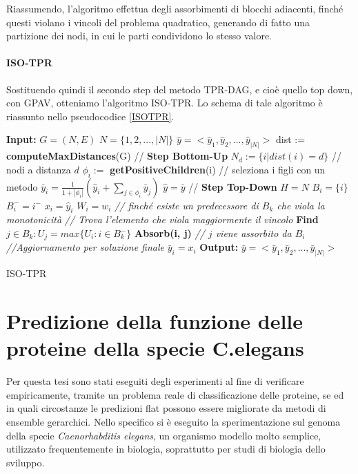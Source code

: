 \documentclass[12pt]{report}
\begin{document}
Riassumendo, l'algoritmo effettua degli assorbimenti di blocchi adiacenti, finché questi violano i vincoli del problema quadratico, generando di fatto una partizione dei nodi, in cui le parti condividono lo stesso valore.

\subsubsection{ISO-TPR}
Sostituendo quindi il secondo step del metodo TPR-DAG, e cioè quello top down, con GPAV, otteniamo l'algoritmo ISO-TPR. Lo schema di tale algoritmo è riassunto nello pseudocodice \ref{ISOTPR}.

\begin{algorithm}[!htp]

\begin{algorithmic}[1]
\State \textbf{Input: }
\State $G = (N, E)$
\State $N = \{1, 2, ..., |N|\} $ 
\State $\hat{y} = <\hat{y}_1, \hat{y}_2, ...,\hat{y}_{|N|}>$
\State dist := \textbf{computeMaxDistances}(G)
\State // \textbf{Step Bottom-Up}
\State $N_d := \{i|dist(i) = d\}$ // nodi a distanza $d$ 
\State $\phi_i :=$  \textbf{getPositiveChildren}(i) // seleziona i figli con un metodo
\State $\bar{y}_i = \frac{1}{1 + |\phi_i|} (\hat{y}_i + \sum_{j \in \phi_i} \bar{y}_j)$
\EndFor
\EndFor
\State $\hat{y} = \bar{y}$
\State // \textbf{Step Top-Down}
\State $ H = N $
\State $B_i = \{i\}$ 
\State $B_i^{-} = i^{-}$
\State $x_i = \hat{y}_i$
\State $W_i = w_i$
\EndFor
{}
\State \emph{// finché esiste un predecessore di $B_{k}$ che viola la monotonicità}
\State \emph{// Trova l'elemento che viola maggiormente il vincolo}
\State \textbf{Find} $j \in B_k: U_j = max\{U_i : i \in B_k^{-}\}$ 
\State \textbf{Absorb(i, j)} \emph{// $j$ viene assorbito da $B_i$}
\EndWhile
\EndFor
\State \emph{//Aggiornamento per soluzione finale }  
\State $\bar{y}_i = x_i$  
\EndFor
\EndFor
\EndProcedure
\State \textbf{Output: }
\State $\bar{y} = <\bar{y}_1, \bar{y}_2, ...,\bar{y}_{|N|}>$
\end{algorithmic}
\caption{ISO-TPR}
\label{ISOTPR}
\end{algorithm}



\chapter{Predizione della funzione delle proteine della specie C.elegans}
Per questa tesi sono stati eseguiti degli esperimenti al fine di verificare empiricamente, tramite un problema reale di classificazione delle proteine, se ed in quali circostanze le predizioni flat possono essere migliorate da metodi di ensemble gerarchici. Nello specifico si è eseguito la sperimentazione sul genoma della specie \textit{Caenorhabditis elegans}, un organismo modello molto semplice, utilizzato frequentemente in biologia, soprattutto per studi di biologia dello sviluppo\cite{hodgkin}.
\newline
\newline
\end{document}
